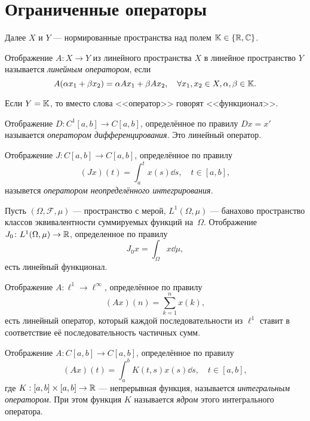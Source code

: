 \section{Ограниченные операторы}

Далее $X$ и $Y$ --- нормированные пространства над полем $\mathbb{K} \in \left\{\mathbb{R},
\mathbb{C}\right\}$.

\begin{definition}
    Отображение $A \colon X \to Y$ из линейного пространства $X$ в линейное пространство $Y$
    называется \emph{линейным оператором}, если
    \[ A(\alpha x_1 + \beta x_2) = \alpha Ax_1 + \beta Ax_2, \quad \forall x_1,
    x_2 \in X, \alpha, \beta \in \mathbb{K}. \]
\end{definition}

Если $Y = \mathbb{K}$, то вместо слова <<оператор>> говорят <<функционал>>.

\begin{example}
    Отображение $D \colon C^1[a, b] \to C[a, b]$, определённое по правилу
    $Dx = x'$ называется \emph{оператором дифференцирования}. Это линейный
    оператор.
\end{example}

\begin{example}
    Отображение $J \colon C[a, b] \to C[a, b]$, определённое по правилу
    \[ (Jx)(t) = \int_{a}^t x(s) \dd s, \quad t \in [a, b], \]
    назывется \emph{оператором неопределённого интегрирования.}
\end{example}

\begin{example}
    Пусть $(\Omega, \mathcal F, \mu)$ --- пространство с мерой, $L^1(\Omega,
    \mu)$ --- банахово пространство классов эквивалентности суммируемых функций
    на~$\Omega$. Отображение $J_0 \colon L^1(\Omega, \mu) \to \mathbb{R}$,
    определенное по правилу
    \[ J_0 x = \int_\Omega x \dd \mu, \]
    есть линейный функционал.
\end{example}

\begin{example}
    Отображение $A \colon \ell^1 \to \ell^\infty$, определённое по правилу
    \[ (Ax)(n) = \sum_{k=1}^n x(k), \]
    есть линейный оператор, который каждой последовательности из $\ell^1$ ставит
    в соответствие её последовательность частичных сумм.
\end{example}

\begin{example}
    Отображение $A \colon C[a, b] \to C[a, b]$, определённое по правилу
    \[ (Ax)(t) = \int_a^b K(t, s) x(s) \dd s, \quad t \in [a,b], \]
    где $K : [a, b] \times [a, b] \to \mathbb{R}$ --- непрерывная функция,
    называется \emph{интегральным оператором}. При этом функция $K$ называется
    \emph{ядром}
    этого интегрального оператора.
\end{example}

